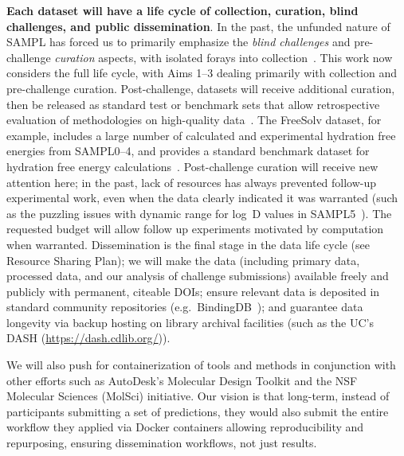 \documentclass[11pt]{article}
\begin{document}

\textbf{Each dataset will have a life cycle of collection, curation, blind challenges, and public dissemination}.
In the past, the unfunded nature of SAMPL has forced us to primarily emphasize the \emph{blind challenges} and pre-challenge \emph{curation} aspects, with isolated forays into collection~\cite{rustenburg_measuring_2016, Newman:2011:JComputAidedMolDes}. 
This work now considers the full life cycle, with Aims 1--3 dealing primarily with collection and pre-challenge curation.
Post-challenge, 
datasets will receive additional curation, then be released as standard test or benchmark sets that allow retrospective evaluation of methodologies on high-quality data~\cite{mobley_predicting_2016}. 
The FreeSolv dataset, for example, includes a large number of calculated and experimental hydration free energies from SAMPL0--4, and provides a standard benchmark dataset for hydration free energy calculations~\cite{Mobley:2014:JComputAidedMolDes}. %
Post-challenge curation will receive new attention here; in the past, lack of resources has always prevented follow-up experimental work, even when the data clearly indicated it was warranted (such as the puzzling issues with dynamic range for log~D values in SAMPL5~\cite{rustenburg_measuring_2016, Bannan:2016:JComputAidedMolDes}).
The requested budget will allow follow up experiments motivated by computation when warranted.
Dissemination is the final stage in the data life cycle (see Resource Sharing Plan); we will make the data (including primary data, processed data, and our analysis of challenge submissions) available freely and publicly with permanent, citeable DOIs; ensure relevant data is deposited in standard community repositories (e.g.~BindingDB~\cite{Liu:2007:Nucl.AcidsRes.}); and guarantee data longevity via backup hosting on library archival facilities (such as the UC's DASH (\url{https://dash.cdlib.org/})).

We will also push for containerization of tools and methods in conjunction with other efforts such as AutoDesk's Molecular Design Toolkit and the NSF Molecular Sciences (MolSci) initiative. %
Our vision is that long-term, instead of participants submitting a set of predictions, they would also submit the entire workflow they applied via Docker containers allowing reproducibility and repurposing, ensuring dissemination workflows, not just results.
\end{document}
